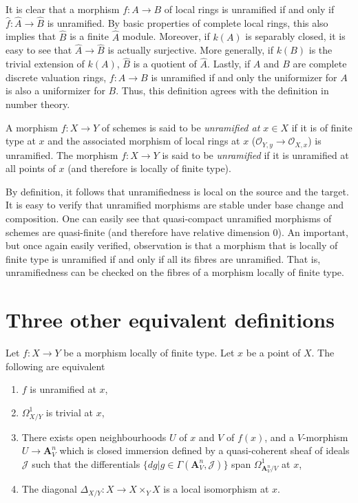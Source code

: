 \noindent
It is clear that a morphism $f:A \to B$ of local rings is unramified if and
only if $\widehat{f}:\widehat{A} \to \widehat{B}$ is unramified. By basic
properties of complete local rings, this also implies that $\widehat{B}$ is a
finite $\widehat{A}$ module. Moreover, if $k(A)$ is separably closed, it is
easy to see that $\widehat{A} \to \widehat{B}$ is actually surjective. More
generally, if $k(B)$ is the trivial extension of $k(A)$, $\widehat{B}$ is a
quotient of $\widehat{A}$. Lastly, if $A$ and $B$ are complete discrete
valuation rings, $f:A \to B$ is unramified if and only the uniformizer for
$A$ is also a uniformizer for $B$. Thus, this definition agrees with the
definition in number theory.

\begin{definition}
\label{definition-unramified-schemes}
A morphism $f:X \to Y$ of schemes is said to be
{\it unramified at $x \in X$} if it
is of finite type at $x$ and the associated morphism of local rings at $x$
($\mathcal{O}_{Y,y} \to \mathcal{O}_{X,x}$) is unramified. The morphism $f:X 
\to Y$ is said to
be {\it unramified} if it is unramified at all points of $x$ (and therefore is
locally of finite type).
\end{definition}

\noindent
By definition, it follows that unramifiedness is local on the source and the
target. It is easy to verify that unramified morphisms are stable under
base change and composition. One can easily see that quasi-compact unramified
morphisms of schemes are quasi-finite (and therefore have relative dimension
$0$). An important, but once again easily verified, observation is that a
morphism that is locally of finite type is unramified if and only if all its
fibres are unramified. That is, unramifiedness can be checked on the fibres
of a morphism locally of finite type.

\section{Three other equivalent definitions}
\label{section-three-other}

\begin{theorem}
\label{theorem-unramified-equivalence}
Let $f:X \to Y$ be a morphism locally of finite type. Let $x$ be a point of
$X$. The following are equivalent
\begin{enumerate}
\item $f$ is unramified at $x$,
\item $\Omega^1_{X/Y}$ is trivial at $x$,
\item There exists open neighbourhoods $U$ of $x$ and $V$ of $f(x)$, and a
$V$-morphism $U \to \mathbf{A}^n_V$ which is closed immersion defined by a
quasi-coherent sheaf of ideals $\mathcal{J}$ such that the differentials
$\{dg | g \in \Gamma(\mathbf{A}^n_V,\mathcal{J})\}$ span 
$\Omega^1_{\mathbf{A}^n_V/V}$ at $x$,
\item The diagonal $\Delta_{X/Y}:X \to X \times_Y X$ is a local isomorphism at
$x$.
\end{enumerate}
\end{theorem}

